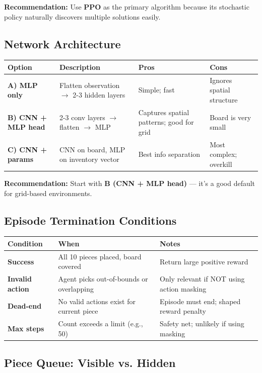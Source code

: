 \documentclass[11pt,a4paper]{article}
\begin{document}
\textbf{Recommendation:} Use \textbf{PPO} as the primary algorithm because its stochastic policy naturally discovers multiple solutions easily.

\subsection{Network Architecture}

\noindent
\begin{tabular}{|l|p{3.5cm}|p{3.5cm}|p{3.5cm}|}
\hline
\textbf{Option} & \textbf{Description} & \textbf{Pros} & \textbf{Cons} \\
\hline
\textbf{A) MLP only} & Flatten observation $\rightarrow$ 2-3 hidden layers & Simple; fast & Ignores spatial structure \\
\hline
\textbf{B) CNN + MLP head} & 2-3 conv layers $\rightarrow$ flatten $\rightarrow$ MLP & Captures spatial patterns; good for grid & Board is very small \\
\hline
\textbf{C) CNN + params} & CNN on board, MLP on inventory vector & Best info separation & Most complex; overkill \\
\hline
\end{tabular}

\textbf{Recommendation:} Start with \textbf{B (CNN + MLP head)} --- it's a good default for grid-based environments.

\subsection{Episode Termination Conditions}

\noindent
\begin{tabular}{|l|p{3.5cm}|p{7.5cm}|}
\hline
\textbf{Condition} & \textbf{When} & \textbf{Notes} \\
\hline
\textbf{Success} & All 10 pieces placed, board covered & Return large positive reward \\
\hline
\textbf{Invalid action} & Agent picks out-of-bounds or overlapping & Only relevant if NOT using action masking \\
\hline
\textbf{Dead-end} & No valid actions exist for current piece & Episode must end; shaped reward penalty \\
\hline
\textbf{Max steps} & Count exceeds a limit (e.g., 50) & Safety net; unlikely if using masking \\
\hline
\end{tabular}

\subsection{Piece Queue: Visible vs. Hidden}
\end{document}
